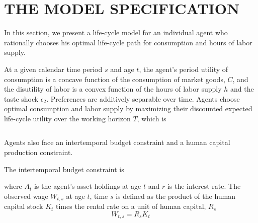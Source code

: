 \documentclass{article}
\begin{document}
\section{THE MODEL SPECIFICATION}
\label{section:model}
In this section, we present a life-cycle model for an individual agent who rationally chooses his optimal life-cycle path for consumption and hours of labor supply. \par
At a given calendar time period $s$ and age $t$, the agent's period utility of consumption is a concave function of the consumption of market goods, $C$, and the disutility of labor is a convex function of the hours of labor supply $h$ and the taste shock $\epsilon_2$. Preferences are additively separable over time. Agents choose optimal consumption and labor supply by maximizing their discounted expected life-cycle
utility over the working horizon $T$, which is

\begin{equation} \tag{1}
\label{eq:LCU}

\end{equation}

Agents also face an intertemporal budget constraint and a human capital production constraint. \par
The intertemporal budget constraint is
\begin{equation} \tag{2}
  \label{eq:IBC}

\end{equation}

where $A_t$ is the agent's asset holdings at age $t$ and $r$ is the interest rate. The observed wage $W_{t,s}$ at age $t$, time $s$ is defined as the product of the human capital stock $K_t$ times the rental rate on a unit of human capital, $R_s$
\begin{equation} \tag{3}
W_{t,s}=R_sK_t
\end{equation}
\end{document}
